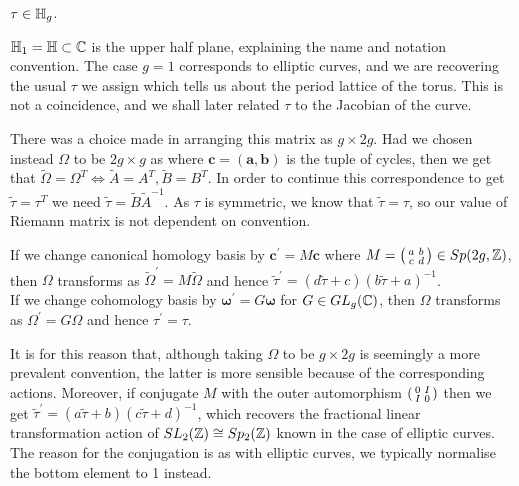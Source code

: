 \documentclass{article}
\begin{document}
\begin{lemma} $\tau \in \mathbb{H}_g$.  
\end{lemma}

\begin{example}
	$\mathbb{H}_1 = \mathbb{H} \subset \mathbb{C}$ is the upper half plane, explaining the name and notation convention. The case $g=1$ corresponds to elliptic curves, and we are recovering the usual $\tau$ we assign which tells us about the period lattice of the torus. This is not a coincidence, and we shall later related $\tau$ to the Jacobian of the curve. 
\end{example}


\begin{remark}
	There was a choice made in arranging this matrix as $g \times 2g$. Had we chosen instead $\Omega$ to be $2g \times g$ as 
	where $\bm{c} = (\bm{a},\bm{b})$ is the tuple of cycles, then we get that $\tilde{\Omega} = \Omega^T \Leftrightarrow \tilde{A}=A^T, \tilde{B} = B^T$. In order to continue this correspondence to get $\tilde{\tau} = \tau^T$ we need $\tilde{\tau} = \tilde{B} \tilde{A}^{-1}$. As $\tau$ is symmetric, we know that $\tilde{\tau} = \tau$, so our value of Riemann matrix is not dependent on convention. 
\end{remark}

\begin{lemma}
	If we change canonical homology basis by $\bm{c}^\prime = M \bm{c}$ where $M = \begin{psmallmatrix} a & b \\ c & d \end{psmallmatrix} \in Sp(2g,\mathbb{Z})$, then $\Omega$ transforms as $\tilde{\Omega}^\prime = M\tilde{\Omega}$ and hence $\tilde{\tau}^\prime = (d\tilde{\tau}+c)(b\tilde{\tau}+a)^{-1}$. \\
	If we change cohomology basis by $\bm{\omega}^\prime = G \bm{\omega}$ for $G \in GL_g(\mathbb{C})$, then $\Omega$ transforms as $\Omega^\prime = G\Omega$ and hence $\tau^\prime = \tau$.   
\end{lemma}
\begin{remark}
	It is for this reason that, although taking $\Omega$ to be $g \times 2g$ is seemingly a more prevalent convention, the latter is more sensible because of the corresponding actions. Moreover, if conjugate $M$ with the outer automorphism $\begin{psmallmatrix} 0 & I \\ I & 0 \end{psmallmatrix}$ then we get $\tilde{\tau}^\prime = (a\tilde{\tau}+b)(c\tilde{\tau}+d)^{-1}$, which recovers the fractional linear transformation action of $SL_2(\mathbb{Z}) \cong Sp_2(\mathbb{Z})$ known in the case of elliptic curves. The reason for the conjugation is as with elliptic curves, we typically normalise the bottom element to 1 instead. 
\end{remark}
\end{document}
